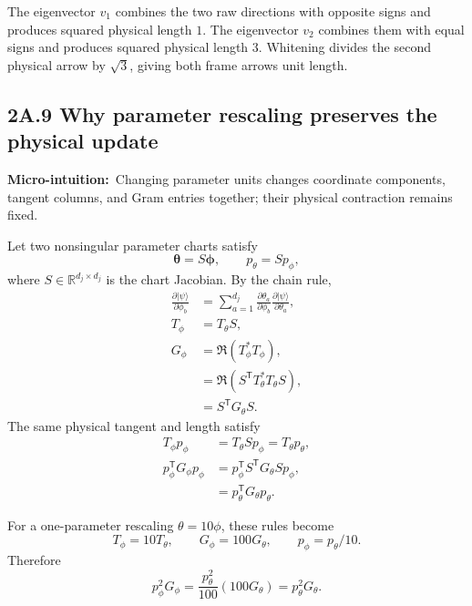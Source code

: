 \documentclass[10pt,twocolumn]{article}
\newcommand{\ket}[1]{|#1\rangle}
\newcommand{\micro}[1]{\par\noindent\textbf{Micro-intuition:}\ #1\par}
\newcommand{\conceptbreak}{\par\medskip\noindent{\color{black!30}\rule{\columnwidth}{0.35pt}}\par\medskip}
\begin{document}
The eigenvector \(v_1\) combines the two raw directions with opposite signs
and produces squared physical length \(1\). The eigenvector \(v_2\) combines
them with equal signs and produces squared physical length \(3\). Whitening
divides the second physical arrow by \(\sqrt3\), giving both frame arrows unit
length.

\conceptbreak

\subsection*{2A.9 Why parameter rescaling preserves the physical update}

\micro{Changing parameter units changes coordinate components, tangent columns,
and Gram entries together; their physical contraction remains fixed.}

Let two nonsingular parameter charts satisfy
\begin{equation}
\bm\theta=S\bm\phi,
\qquad
p_\theta=Sp_\phi,
\label{eq:bridge-chart-change}
\end{equation}
where \(S\in\mathbb R^{d_j\times d_j}\) is the chart Jacobian. By the chain
rule,
\begin{align}
\frac{\partial\ket\psi}{\partial\phi_b}
&=\sum_{a=1}^{d_j}
\frac{\partial\theta_a}{\partial\phi_b}
\frac{\partial\ket\psi}{\partial\theta_a},
\label{eq:bridge-chain-rule-components}\\
T_\phi&=T_\theta S,
\label{eq:bridge-tangent-chart-rule}\\
G_\phi
&=\Re(T_\phi^*T_\phi),
\label{eq:bridge-metric-chart-rule-1}\\
&=\Re(S^{\mathsf T}T_\theta^*T_\theta S),
\label{eq:bridge-metric-chart-rule-2}\\
&=S^{\mathsf T}G_\theta S.
\label{eq:bridge-metric-chart-rule-3}
\end{align}
The same physical tangent and length satisfy
\begin{align}
T_\phi p_\phi
&=T_\theta Sp_\phi
=T_\theta p_\theta,
\label{eq:bridge-chart-physical-invariance}\\
p_\phi^{\mathsf T}G_\phi p_\phi
&=p_\phi^{\mathsf T}S^{\mathsf T}G_\theta Sp_\phi,
\label{eq:bridge-chart-length-invariance-1}\\
&=p_\theta^{\mathsf T}G_\theta p_\theta.
\label{eq:bridge-chart-length-invariance-2}
\end{align}

For a one-parameter rescaling \(\theta=10\phi\), these rules become
\begin{equation}
T_\phi=10T_\theta,
\qquad
G_\phi=100G_\theta,
\qquad
p_\phi=p_\theta/10.
\label{eq:bridge-tenfold-rescaling}
\end{equation}
Therefore
\begin{equation}
p_\phi^2G_\phi
=\frac{p_\theta^2}{100}(100G_\theta)
=p_\theta^2G_\theta.
\label{eq:bridge-tenfold-length-proof}
\end{equation}
\end{document}

